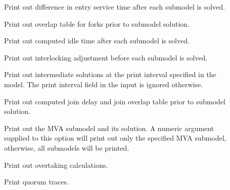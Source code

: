 \begin{description}
\begin{description}
\item[]
Print out difference in entry service time after each submodel is solved.
\item[]
Print out overlap table for forks prior to submodel solution.
\item[]
Print out computed idle time after each submodel is solved.
\item[]
Print out interlocking adjustment before each submodel is solved.
\item[]
Print out intermediate solutions at the print interval specified in the model.
The print interval field in the input is ignored otherwise.
\item[]
Print out computed join delay and join overlap table prior to submodel solution.
\item[]
Print out the MVA submodel and its solution.
A numeric argument supplied to this option will print out only the specified MVA submodel, otherwise, all submodels will be printed.
\item[]
Print out overtaking calculations.
\item[]
Print quorum traces.
\item[]


\end{description}
\end{description}
